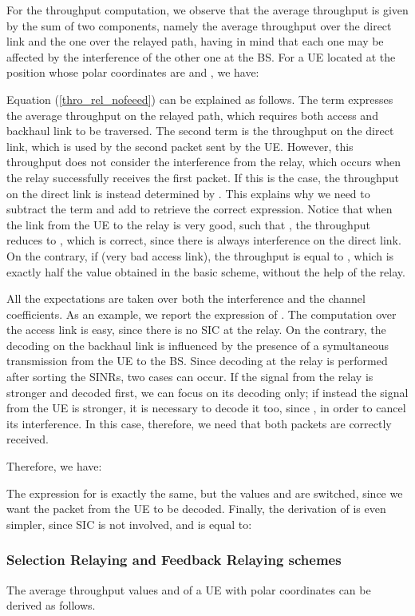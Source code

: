 \documentclass[12pt, letterpaper, onecolumn, draftcls]{IEEEtran}
\begin{document}
For the throughput computation, we observe that the average throughput is given by the sum of two components, namely the average throughput over the direct link and the one over the relayed path, having in mind that each one may be affected by the interference of the other one at the BS. For a UE located at the position whose polar coordinates are  and , we have:


Equation (\ref{thro_rel_nofeeed}) can be explained as follows. The term  expresses the average throughput on the relayed path, which requires both access and backhaul link to be traversed. The second term is the throughput on the direct link, which is used by the second packet sent by the UE. However, this throughput does not consider the interference from the relay, which occurs when the relay successfully receives the first packet.
If this is the case, the throughput on the direct link is instead determined by . This explains why we need to subtract the term  and add  to retrieve the correct expression.
Notice that when the link from the UE to the relay is very good, such that , the throughput reduces to , which is correct, since there is always interference on the direct link. On the contrary, if  (very bad access link), the throughput is equal to , which is exactly half the value obtained in the basic scheme, without the help of the relay.

All the expectations are taken over both the interference and the channel coefficients. As an example, we report the expression of . The computation over the access link is easy, since there is no SIC at the relay. On the contrary, the decoding on the backhaul link is influenced by the presence of a symultaneous transmission from the UE to the BS.
Since decoding at the relay is performed after sorting the SINRs, two cases can occur. If the signal from the relay is stronger and decoded first, we can focus on its decoding only; if instead the signal from the UE is stronger, it is necessary to decode it too, since , in order to cancel its interference. In this case, therefore, we need that both packets are correctly received.

Therefore, we have:


The expression for  is exactly the same, but the values  and  are switched, since we want the packet from the UE to be decoded. Finally, the derivation of  is even simpler, since SIC is not involved, and is equal to:


\subsubsection{Selection Relaying and Feedback Relaying schemes}
The average throughput values  and  of a UE with polar coordinates  can be derived as follows.
\end{document}
